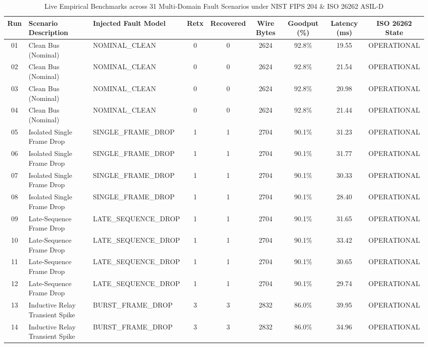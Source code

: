 \begin{table}[t]
\centering
\caption{Live Empirical Benchmarks across 31 Multi-Domain Fault Scenarios under NIST FIPS 204 \& ISO 26262 ASIL-D}
\label{tab:fault_recovery_benchmark}
\small
\begin{tabular}{cllcccccc}
\toprule
\textbf{Run} & \textbf{Scenario Description} & \textbf{Injected Fault Model} & \textbf{Retx} & \textbf{Recovered} & \textbf{Wire Bytes} & \textbf{Goodput (\%)} & \textbf{Latency (ms)} & \textbf{ISO 26262 State} \\
\midrule
01 & Clean Bus (Nominal) & NOMINAL\_CLEAN & 0 & 0 & 2624 & 92.8\% & 19.55 & OPERATIONAL \\
02 & Clean Bus (Nominal) & NOMINAL\_CLEAN & 0 & 0 & 2624 & 92.8\% & 21.54 & OPERATIONAL \\
03 & Clean Bus (Nominal) & NOMINAL\_CLEAN & 0 & 0 & 2624 & 92.8\% & 20.98 & OPERATIONAL \\
04 & Clean Bus (Nominal) & NOMINAL\_CLEAN & 0 & 0 & 2624 & 92.8\% & 21.44 & OPERATIONAL \\
\midrule
05 & Isolated Single Frame Drop & SINGLE\_FRAME\_DROP & 1 & 1 & 2704 & 90.1\% & 31.23 & OPERATIONAL \\
06 & Isolated Single Frame Drop & SINGLE\_FRAME\_DROP & 1 & 1 & 2704 & 90.1\% & 31.77 & OPERATIONAL \\
07 & Isolated Single Frame Drop & SINGLE\_FRAME\_DROP & 1 & 1 & 2704 & 90.1\% & 30.33 & OPERATIONAL \\
08 & Isolated Single Frame Drop & SINGLE\_FRAME\_DROP & 1 & 1 & 2704 & 90.1\% & 28.40 & OPERATIONAL \\
\midrule
09 & Late-Sequence Frame Drop & LATE\_SEQUENCE\_DROP & 1 & 1 & 2704 & 90.1\% & 31.65 & OPERATIONAL \\
10 & Late-Sequence Frame Drop & LATE\_SEQUENCE\_DROP & 1 & 1 & 2704 & 90.1\% & 33.42 & OPERATIONAL \\
11 & Late-Sequence Frame Drop & LATE\_SEQUENCE\_DROP & 1 & 1 & 2704 & 90.1\% & 30.65 & OPERATIONAL \\
12 & Late-Sequence Frame Drop & LATE\_SEQUENCE\_DROP & 1 & 1 & 2704 & 90.1\% & 29.74 & OPERATIONAL \\
\midrule
13 & Inductive Relay Transient Spike & BURST\_FRAME\_DROP & 3 & 3 & 2832 & 86.0\% & 39.95 & OPERATIONAL \\
14 & Inductive Relay Transient Spike & BURST\_FRAME\_DROP & 3 & 3 & 2832 & 86.0\% & 34.96 & OPERATIONAL \\

\end{tabular}
\end{table}
